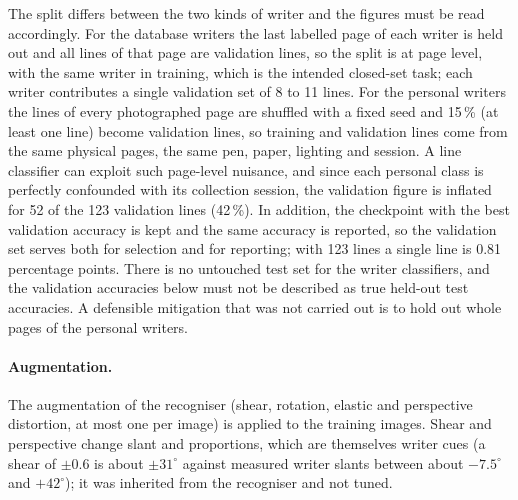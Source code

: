 The split differs between the two kinds of writer and the figures must be read accordingly.
For the database writers the last labelled page of each writer is held out and all lines of that page are validation lines, so the split is at page level, with the same writer in training, which is the intended closed-set task; each writer contributes a single validation set of 8 to 11 lines.
For the personal writers the lines of every photographed page are shuffled with a fixed seed and 15\,\% (at least one line) become validation lines, so training and validation lines come from the same physical pages, the same pen, paper, lighting and session.
A line classifier can exploit such page-level nuisance, and since each personal class is perfectly confounded with its collection session, the validation figure is inflated for 52 of the 123 validation lines (42\,\%).
In addition, the checkpoint with the best validation accuracy is kept and the same accuracy is reported, so the validation set serves both for selection and for reporting; with 123 lines a single line is 0.81 percentage points.
There is no untouched test set for the writer classifiers, and the validation accuracies below must not be described as true held-out test accuracies.
A defensible mitigation that was not carried out is to hold out whole pages of the personal writers.

\paragraph{Augmentation.}
The augmentation of the recogniser (shear, rotation, elastic and perspective distortion, at most one per image) is applied to the training images. Shear and perspective change slant and proportions, which are themselves writer cues (a shear of $\pm0.6$ is about $\pm31^\circ$ against measured writer slants between about $-7.5^\circ$ and $+42^\circ$); it was inherited from the recogniser and not tuned.

